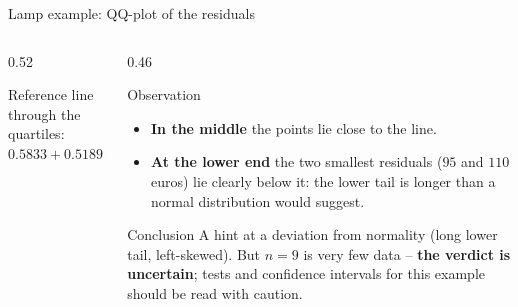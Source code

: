 \documentclass[aspectratio=169,11pt]{beamer}
\begin{document}
\begin{frame}{Lamp example: QQ-plot of the residuals}
  \begin{columns}[T]
    \begin{column}{0.52\textwidth}
      \begin{center}\footnotesize
        Reference line through the quartiles: $0.5833 + 0.5189\,z$
      \end{center}
    \end{column}
    \begin{column}{0.46\textwidth}
      \small
      \begin{block}{Observation}
        \begin{itemize}
          \item \textbf{In the middle} the points lie close to the line.
          \item \textbf{At the lower end} the two smallest residuals
                ($95$ and $110$ euros) lie clearly below it: the lower tail is
                longer than a normal distribution would suggest.
        \end{itemize}
      \end{block}
      \begin{alertblock}{Conclusion}
        A hint at a deviation from normality (long lower tail, left-skewed).
        But $n = 9$ is very few data -- \textbf{the verdict is uncertain};
        tests and confidence intervals for this example should be read with
        caution.
      \end{alertblock}
    \end{column}
  \end{columns}
\end{frame}
\end{document}
